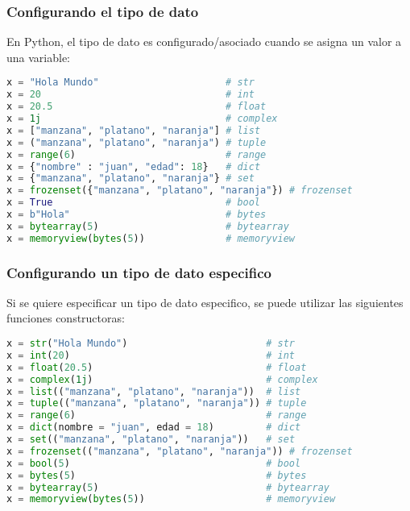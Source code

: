 \begin{frame}[fragile]
  \frametitle{Configurando el tipo de dato}

  \vspace{\baselineskip}
  En Python, el tipo de dato es configurado/asociado cuando se asigna un
  valor a una variable:

  \begin{lstlisting}[language=Python]
x = "Hola Mundo"                      # str
x = 20                                # int
x = 20.5                              # float
x = 1j                                # complex
x = ["manzana", "platano", "naranja"] # list
x = ("manzana", "platano", "naranja") # tuple
x = range(6)                          # range
x = {"nombre" : "juan", "edad": 18}   # dict
x = {"manzana", "platano", "naranja"} # set
x = frozenset({"manzana", "platano", "naranja"}) # frozenset
x = True                              # bool
x = b"Hola"                           # bytes
x = bytearray(5)                      # bytearray
x = memoryview(bytes(5))              # memoryview
  \end{lstlisting}
\end{frame}

\begin{frame}[fragile]
  \frametitle{Configurando un tipo de dato especifico}

  \vspace{\baselineskip}
  Si se quiere especificar un tipo de dato especifico, se puede utilizar
  las siguientes funciones constructoras:

  \begin{lstlisting}[language=Python]
x = str("Hola Mundo")                        # str
x = int(20)                                  # int
x = float(20.5)                              # float
x = complex(1j)                              # complex
x = list(("manzana", "platano", "naranja"))  # list
x = tuple(("manzana", "platano", "naranja")) # tuple
x = range(6)                                 # range
x = dict(nombre = "juan", edad = 18)         # dict
x = set(("manzana", "platano", "naranja"))   # set
x = frozenset(("manzana", "platano", "naranja")) # frozenset
x = bool(5)                                  # bool
x = bytes(5)                                 # bytes
x = bytearray(5)                             # bytearray
x = memoryview(bytes(5))                     # memoryview
  \end{lstlisting}
\end{frame}

